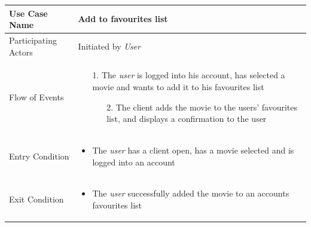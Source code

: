 \begin{center}
	\begin{tabular}{ | l | p{10cm} |  }
		 \hline
		Use Case Name & Add to favourites list \\ \hline
		Participating Actors & Initiated by \emph{User} \\ \hline
		Flow of Events & \begin{enumerate}
						\item[1.] The \emph{user} is logged into his account, has selected a movie and wants to add it to his favourites list
						\begin{enumerate}
							\item[2.] The client adds the movie to the users' favourites list, and displays a confirmation to the user
						\end{enumerate}
					\end{enumerate} \\ \hline
		Entry Condition & \begin{itemize}
						\item The \emph{user} has a client open, has a movie selected and is logged into an account
					\end{itemize} \\ \hline
		Exit Condition & \begin{itemize}
						\item The \emph{user} successfully added the movie to an accounts favourites list
					\end{itemize} \\
		\hline
	\end{tabular}
\end{center}

